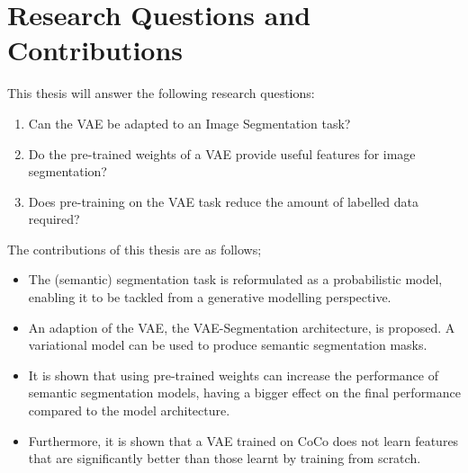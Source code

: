 \section{Research Questions and Contributions}
This thesis will answer the following research questions:
\begin{enumerate}
    \item Can the VAE be adapted to an Image Segmentation task?
    \item Do the pre-trained weights of a VAE provide useful features for image segmentation?
    \item Does pre-training on the VAE task reduce the amount of labelled data required?
\end{enumerate}
The contributions of this thesis are as follows;
\begin{itemize}
    \item The (semantic) segmentation task is reformulated as a probabilistic model, enabling it to be tackled from a generative modelling perspective.
    \item An adaption of the VAE, the VAE-Segmentation architecture, is proposed. A variational model can be used to produce semantic segmentation masks.
    \item It is shown that using pre-trained weights can increase the performance of semantic segmentation models, having a bigger effect on the final performance compared to the model architecture.
    \item  Furthermore, it is shown that a VAE trained on CoCo does not learn features that are significantly better than those learnt by training from scratch.
\end{itemize}
